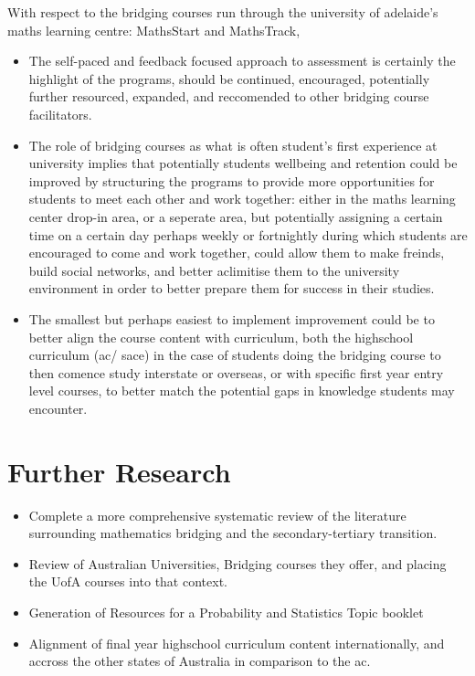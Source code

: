 \documentclass[twoside,12pt,a4paper]{report}
\begin{document}
With respect to the bridging courses run through the university of adelaide's maths learning centre: MathsStart and MathsTrack,
\begin{itemize}
	\item The self-paced and feedback focused approach to assessment is certainly the highlight of the programs, should be continued, encouraged, potentially further resourced, expanded, and reccomended to other bridging course facilitators.
	\item The role of bridging courses as what is often student's first experience at university implies that potentially students wellbeing and retention could be improved by structuring the programs to provide more opportunities for students to meet each other and work together: either in the maths learning center drop-in area, or a seperate area, but potentially assigning a certain time on a certain day perhaps weekly or fortnightly during which students are encouraged to come and work together, could allow them to make freinds, build social networks, and better aclimitise them to the university environment in order to better prepare them for success in their studies.
	\item The smallest but perhaps easiest to implement improvement could be to better align the course content with curriculum, both the highschool curriculum (\gls{ac}/ \gls{sace}) in the case of students doing the bridging course to then comence study interstate or overseas, or with specific first year entry level courses, to better match the potential gaps in knowledge students may encounter.
\end{itemize}



\section{Further Research}

\begin{itemize}
	\item Complete a more comprehensive systematic review of the literature surrounding mathematics bridging and the secondary-tertiary transition.
	\item Review of Australian Universities, Bridging courses they offer, and placing the UofA courses into that context.
	\item Generation of Resources for a Probability and Statistics Topic booklet
	\item Alignment of final year highschool curriculum content internationally, and accross the other states of Australia in comparison to the \gls{ac}.
\end{itemize}
\end{document}

